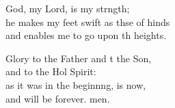 \begin{psalmverse}
\begin{patverse}
God, my Lord, is my strngth;\Flex\\
he makes my feet swift as thse of hinds\Med\\
and enables me to go upon th heights.

Glory to the Father and t the Son,\Med\\
and to the Hol Spirit:\\
as it was in the beginn\pointup{\i}ng, is now,\Med\\
and will be forever. men. 
  \end{patverse}
\end{psalmverse}
